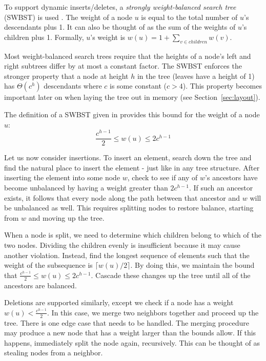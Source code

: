 \documentclass[preprint]{style}
\begin{document}
To support dynamic inserts/deletes, a \textit{strongly weight-balanced search
tree} (SWBST) is used \cite{swbst}.  The weight of a node $u$ is equal to the
total number of $u$'s descendants plus 1. It can also be thought of as the sum
of the weights of $u$'s children plus 1. Formally, $u$'s weight is $w(u) = 1 +
\sum_{v \in children} w(v)$.

Most weight-balanced search trees require that the heights of a node's left and
right subtrees differ by at most a constant factor. The SWBST enforces the
stronger property that a node at height $h$ in the tree (leaves have a height
of 1) has $\Theta(c^h)$ descendants where $c$ is some constant ($c > 4$). This
property becomes important later on when laying the tree out in memory (see
Section~\ref{sec:layout}).

The definition of a SWBST given in \cite{swbst} provides this bound for the
weight of a node $u$:
\begin{equation}
  \label{eq:bounds}
  \frac{c^{h-1}}{2} \leq w(u) \leq 2c^{h-1}
\end{equation}

Let us now consider insertions. To insert an element, search
down the tree and find the natural place to insert the element - just like in
any tree structure. After inserting the element into some node $w$, 
check to see if any of $w$'s ancestors have become unbalanced by having a
weight greater than $2c^{h-1}$. If such an ancestor exists, it follows that
every node along the path between that ancestor and $w$ will be unbalanced as
well. This requires splitting nodes to restore balance, starting from $w$
and moving up the tree.

When a node is split, we need to determine which children belong to which of
the two nodes. Dividing the children evenly is insufficient because it may
cause another violation. Instead, find the longest sequence of elements such
that the weight of the subsequence is $\lceil w(u)/2 \rceil$.  By doing this,
we maintain the bound that $\frac{c^{h-1}}{2} \leq w(u) \leq 2c^{h-1}$. Cascade
these changes up the tree until all of the ancestors are balanced.

Deletions are supported similarly, except we check if a node has a weight $w(u)
< \frac{c^{h-1}}{2}$. In this case, we merge two neighbors together and proceed
up the tree. There is one edge case that needs to be handled. The merging
procedure may produce a new node that has a weight larger than the bounds
allow. If this happens, immediately split the node again, recursively. This can
be thought of as stealing nodes from a neighbor.
\end{document}
